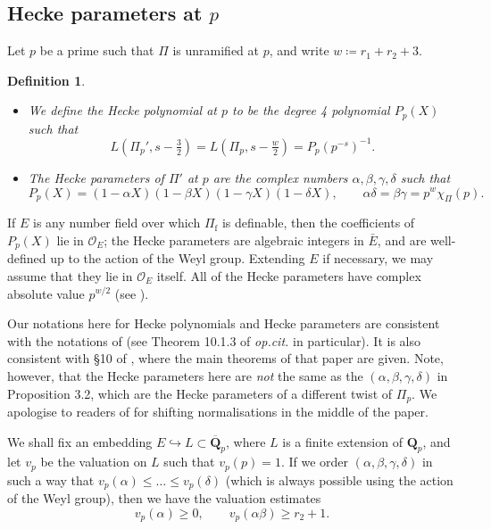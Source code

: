 \documentclass[cjm]{ipart}
\theoremstyle{plain}
\newtheorem{definition}[theorem]{Definition}
\theoremstyle{remark}
\newcommand{\Pif}{\Pi_{\mathrm{f}}}
\newcommand{\QQbar}{\overline{\QQ}}
\newcommand{\QQ}{\mathbf{Q}}
\newcommand{\Qp}{\QQ_p}
\newcommand{\cO}{\mathcal{O}}
\newcommand{\into}{\hookrightarrow}
\numberwithin{equation}{subsection}
\renewcommand{\le}{\leqslant}
\renewcommand{\ge}{\geqslant}
\begin{document}
 \subsection{Hecke parameters at $p$}
  \label{sect:heckeparams}

  Let $p$ be a prime such that $\Pi$ is unramified at $p$, and write $w \coloneqq r_1 + r_2 + 3$.

  \begin{definition} \
   \begin{itemize}
    \item We define the \emph{Hecke polynomial} at $p$ to be the degree 4 polynomial $P_p(X)$ such that
    \[ L(\Pi_p', s - \tfrac{3}{2}) = L(\Pi_p, s - \tfrac{w}{2}) = P_p(p^{-s})^{-1}. \]
    \item The \emph{Hecke parameters} of $\Pi'$ at $p$ are the complex numbers $\alpha, \beta, \gamma, \delta$ such that
    \[
     P_p(X) = (1 - \alpha X) (1 - \beta X) (1 - \gamma X) (1 - \delta X),\qquad
     \alpha \delta = \beta \gamma = p^w \chi_{\Pi}(p).
    \]
   \end{itemize}
  \end{definition}

  If $E$ is any number field over which $\Pif$ is definable, then the coefficients of $P_p(X)$ lie in $\cO_E$; the Hecke parameters are algebraic integers in $\bar{E}$, and are well-defined up to the action of the Weyl group. Extending $E$ if necessary, we may assume that they lie in $\cO_E$ itself. All of the Hecke parameters have complex absolute value $p^{w/2}$ (see \cite[Theorem 1]{weissauer05}).

  \begin{note}
   Our notations here for Hecke polynomials and Hecke parameters are consistent with the notations of \cite{LSZ17} (see Theorem 10.1.3 of \emph{op.cit.} in particular). It is also consistent with \S 10 of \cite{LPSZ1}, where the main theorems of that paper are given. Note, however, that the Hecke parameters here are \emph{not} the same as the $(\alpha, \beta, \gamma, \delta)$ in \cite{LPSZ1} Proposition 3.2, which are the Hecke parameters of a different twist of $\Pi_p$. We apologise to readers of \cite{LPSZ1} for shifting normalisations in the middle of the paper.
  \end{note}

  We shall fix an embedding $E \into L \subset \QQbar_p$, where $L$ is a finite extension of $\Qp$, and let $v_p$ be the valuation on $L$ such that $v_p(p) = 1$. If we order $(\alpha, \beta, \gamma, \delta)$ in such a way that $v_p(\alpha) \le \dots \le v_p(\delta)$ (which is always possible using the action of the Weyl group), then we have the valuation estimates
  \begin{equation}
   \label{eq:valuations}
   v_p(\alpha) \ge 0,\qquad v_p(\alpha \beta) \ge r_2 + 1.
  \end{equation}
\end{document}
